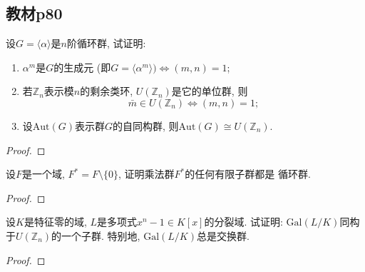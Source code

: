\subsection{教材p80}

\begin{problem}
    设$G = \langle \alpha \rangle$是$n$阶循环群, 试证明: 
\begin{enumerate}[(1)]
    \item $\alpha^m$是$G$的生成元 (即$G = \langle \alpha^m \rangle ) \Leftrightarrow (m, n) = 1$;
    \item 若$\mathbb{Z}_n$表示模$n$的剩余类环, $U(\mathbb{Z}_n)$是它的单位群, 则
\[
    \bar{m} \in U(\mathbb{Z}_n) \Leftrightarrow (m, n)=1;
\]
    \item 设$\mathrm{Aut}(G)$表示群$G$的自同构群, 则$\mathrm{Aut}(G) \cong U(\mathbb{Z}_n)$.
\end{enumerate}
\end{problem}

\begin{proof}
    
\end{proof}

\begin{problem}
    设$F$是一个域, $F^* = F \setminus \{0\}$, 证明乘法群$F^*$的任何有限子群都是
循环群.
\end{problem}

\begin{proof}
    
\end{proof}

\begin{problem}
    设$K$是特征零的域, $L$是多项式$x^n - 1 \in K[x]$的分裂域. 试证明: 
$\mathrm{Gal}(L/K)$同构于$U(\mathbb{Z}_n)$的一个子群. 特别地, 
$\mathrm{Gal}(L/K)$总是交换群.
\end{problem}

\begin{proof}
    
\end{proof}